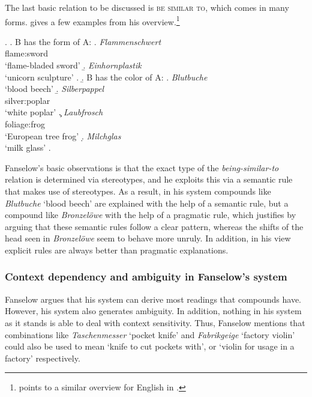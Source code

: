 The last basic relation to be discussed is \textsc{be similar to},
which comes in many forms. \Next gives a few examples from his
overview.\footnote{\citet[Footnote 13, p.~188]{Fanselow:1981} points to a similar overview for English in
  \citet{Warren:1978}.}

\ex. \a. B has the form of A: 
\a. \gll
\emph{Flammenschwert}\\
flame:sword\\
`flame-bladed sword'
\b. 
\emph{Einhornplastik}\\
`unicorn sculpture'
\z.
\b. B has the color of A:
\a. \emph{Blutbuche}\\
`blood beech' 
\b. \gll
\emph{Silberpappel}\\
silver:poplar\\
`white poplar' 
\c. \gll
\emph{Laubfrosch}\\
foliage:frog\\
`European tree frog'
\d. \emph{Milchglas}\\
`milk glass'
\z.

Fanselow's basic observations is that the exact type of the
  \emph{being-similar-to} relation is determined via stereotypes, and he
  exploits this via a semantic rule that makes use of stereotypes. As a
  result, in his system compounds like \emph{Blutbuche} `blood beech'
  are explained with the help of a semantic rule, but a compound like
  \emph{Bronzelöwe} with the help of a
  pragmatic rule, which \citet[191]{Fanselow:1981} justifies by
  arguing that these semantic rules follow a clear pattern, whereas
  the shifts of the head
  seen in \emph{Bronzelöwe} seem to behave more
    unruly. In addition, in his view explicit rules are always better than pragmatic explanations.
\subsubsection{Context dependency and ambiguity in Fanselow's system}
\label{sec:fanselow_big_picture}

Fanselow argues that his system can derive most readings that compounds have.
However, his system also generates ambiguity. 
In addition, nothing in his
system as it stands is able to deal with context sensitivity.
 Thus, Fanselow
mentions that combinations like \emph{Taschenmesser} `pocket knife'
and
\emph{Fabrikgeige} `factory violin' could also be used to mean `knife
      to cut pockets with', or `violin for usage in a factory' respectively.

